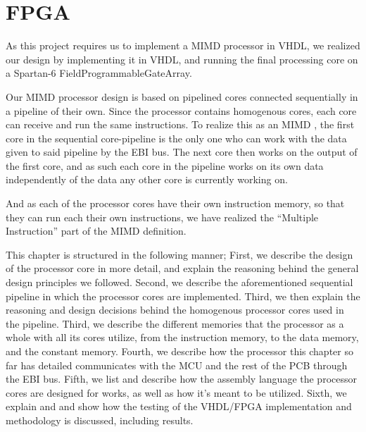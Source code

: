 \chapter{FPGA}\label{chapter:fpga}

As this project requires us to implement a MIMD processor in VHDL, we realized
our design by implementing it in VHDL, and running the final processing core on
a Spartan-6 FieldProgrammableGateArray.

Our MIMD processor design is based on pipelined cores connected sequentially in
a pipeline of their own. Since the processor contains homogenous cores, each
core can receive and run the same instructions. To realize this as an MIMD , the first core in
the sequential core-pipeline is the only one who can work with the data given to
said pipeline by the EBI bus. The next core then works on the output of the
first core, and as such each core in the pipeline works on its own data
independently of the data any other core is currently working on.

And as each of the processor cores have their own instruction memory, so that
they can run each their own instructions, we have realized the ``Multiple
Instruction''  part of the MIMD definition.

This chapter is structured in the following manner; First, we describe the
design of the processor core in more detail, and explain the reasoning behind
the general design principles we followed. Second, we describe the
aforementioned sequential pipeline in which the processor cores are implemented.
Third, we then explain the reasoning and design decisions behind the homogenous
processor cores used in the pipeline. Third, we describe the different memories
that the processor as a whole with all its cores utilize, from the instruction
memory, to the data memory, and the constant memory. Fourth,
we describe how the processor this chapter so far has detailed communicates with
the MCU and the rest of the PCB through the EBI bus. Fifth, we list and
describe how the assembly language the processor cores are designed for works,
as well as how it's meant to be utilized. Sixth, we explain and and show how the
testing of the VHDL/FPGA  implementation
and methodology is discussed, including results.
%







